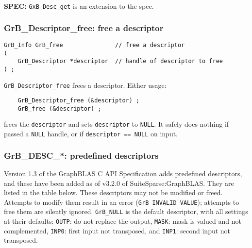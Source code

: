 \documentclass[12pt]{article}
\begin{document}
\begin{spec}
{\bf SPEC:} \verb'GxB_Desc_get' is an extension to the spec.
\end{spec}

\subsubsection{{\sf GrB\_Descriptor\_free:} free a descriptor}
\label{descriptor_free}

\begin{mdframed}[userdefinedwidth=6in]
{\footnotesize
\begin{verbatim}
GrB_Info GrB_free               // free a descriptor
(
    GrB_Descriptor *descriptor  // handle of descriptor to free
) ;
\end{verbatim} } \end{mdframed}

\verb'GrB_Descriptor_free' frees a descriptor.
Either usage:

    {\small
    \begin{verbatim}
    GrB_Descriptor_free (&descriptor) ;
    GrB_free (&descriptor) ; \end{verbatim}}

\noindent
frees the \verb'descriptor' and sets \verb'descriptor' to \verb'NULL'.  It
safely does nothing if passed a \verb'NULL' handle, or if
\verb'descriptor == NULL' on input.

\newpage
\subsubsection{{\sf GrB\_DESC\_*:}  predefined descriptors}
\label{descriptor_predefined}

Version 1.3 of the GraphBLAS C API Specification adds predefined descriptors,
and these have been added as of v3.2.0 of SuiteSparse:GraphBLAS.  They are
listed in the table below.  These descriptors may not be modified or freed.
Attempts to modify them result in an error (\verb'GrB_INVALID_VALUE'); attempts
to free them are silently ignored.
\verb'GrB_NULL' is the default descriptor, with all settings at their defaults:
\verb'OUTP': do not replace the output,
\verb'MASK': mask is valued and not complemented,
\verb'INP0': first input not transposed, and
\verb'INP1': second input not transposed.
\end{document}
